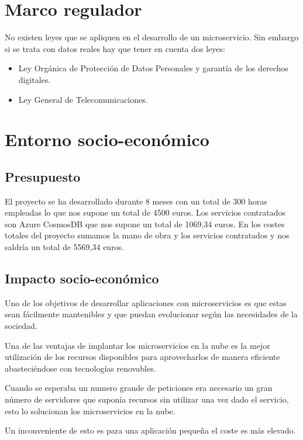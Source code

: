 \documentclass[12pt]{report} %
\begin{document}
\chapter{Marco regulador}

No existen leyes que se apliquen en el desarrollo de un microservicio. Sin embargo si se trata con datos reales hay que tener en cuenta dos leyes:
\begin{itemize}
	\item Ley Orgánica de Protección de Datos Personales y garantía de los derechos digitales.
	\item Ley General de Telecomunicaciones.
\end{itemize}


\chapter{Entorno socio-económico}	

\section{Presupuesto}


El proyecto se ha desarrollado durante 8 meses con un total de 300 horas empleadas lo que nos supone un total de 4500 euros. 
Los servicios contratados son Azure CosmosDB que nos supone un total de 1069,34 euros.
En los costes totales del proyecto sumamos la mano de obra y los servicios contratados y nos saldría un total de 5569,34 euros.


\section{Impacto socio-económico}

Uno de los objetivos de desarrollar aplicaciones con microservicios es que estas sean fácilmente mantenibles y que puedan evolucionar según las necesidades de la sociedad.

Una de las ventajas de implantar los microservicios en la nube es la mejor utilización de los recursos disponibles para aprovecharlos de manera eficiente abasteciéndose con tecnologías renovables.

Cuando se esperaba un numero grande de peticiones era necesario un gran número de servidores que suponía recursos sin utilizar una vez dado el servicio, esto lo solucionan los microservicios en la nube.

Un inconveniente de esto es para una aplicación pequeña el coste es más elevado.
\end{document}
